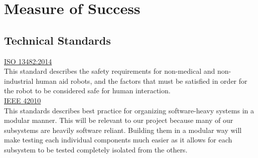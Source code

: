 \documentclass[10pt]{article}
\begin{document}
\section*{Measure of Success}
\subsection*{Technical Standards}
\underline{ISO 13482:2014}\\[0.25\baselineskip]
This standard describes the safety requirements for non-medical and non-industrial human aid robots, and the factors that must be satisfied in order for the robot to be considered safe for human interaction.\\[0.1in]
\underline{IEEE 42010}\\[0.25\baselineskip]
This standards describes best practice for organizing software-heavy systems in a modular manner. This will be relevant to our project because many of our subsystems are heavily software reliant. Building them in a modular way will make testing each individual components much easier as it allows for each subsystem to be tested completely isolated from the others.
\end{document}
